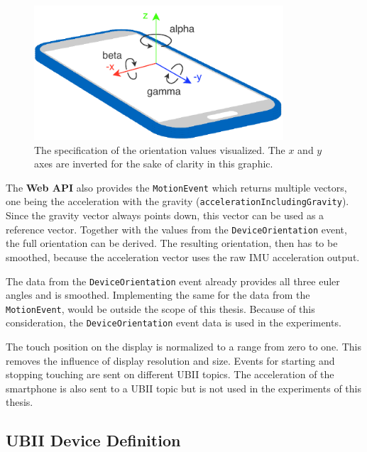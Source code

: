 \begin{figure}[htpb]
  \centering
  \includegraphics[height=5cm]{figures/implementation/webapi_device_orientation.pdf}
  \caption[Device coordinate system and orientation values]{The specification of the orientation values visualized. The \(x\) and \(y\) axes are inverted for the sake of clarity in this graphic.}\label{fig:webapi-device-orientation}
\end{figure}

The \textbf{Web API} also provides the \lstinline{MotionEvent} which returns multiple vectors, one being the acceleration with the gravity (\lstinline{accelerationIncludingGravity}). Since the gravity vector always points down, this vector can be used as a reference vector. Together with the values from the \lstinline{DeviceOrientation} event, the full orientation can be derived. The resulting orientation, then has to be smoothed, because the acceleration vector uses the raw \ac{IMU} acceleration output. %

The data from the \lstinline{DeviceOrientation} event already provides all three euler angles and is smoothed. Implementing the same for the data from the \lstinline{MotionEvent}, would be outside the scope of this thesis. Because of this consideration, the \lstinline{DeviceOrientation} event data is used in the experiments. %

The touch position on the display is normalized to a range from zero to one. This removes the influence of display resolution and size. Events for starting and stopping touching are sent on different \ac{UBII} topics. The acceleration of the smartphone is also sent to a \ac{UBII} topic but is not used in the experiments of this thesis. %


\subsection{UBII Device Definition}\label{subsection:ubii-device-definition}

